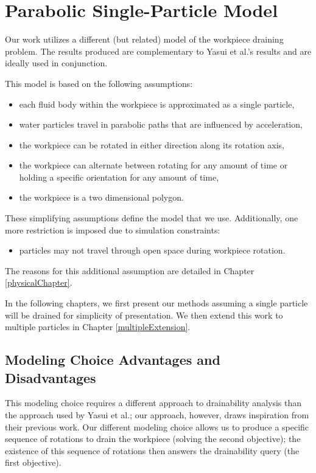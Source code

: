 \section{Parabolic Single-Particle Model}

Our work utilizes a different (but related) model of the workpiece draining problem. The results produced are complementary to Yasui et al.'s results and are ideally used in conjunction.

This model is based on the following assumptions:

\begin{itemize}
	\item each fluid body within the workpiece is approximated as a single particle,
	\item water particles travel in parabolic paths that are influenced by acceleration,
	\item the workpiece can be rotated in either direction along its rotation axis,
	\item the workpiece can alternate between rotating for any amount of time or holding a specific orientation for any amount of time,
	\item the workpiece is a two dimensional polygon.
\end{itemize}

These simplifying assumptions define the model that we use. Additionally, one more restriction is imposed due to simulation constraints:

\begin{itemize}
	\item particles may not travel through open space during workpiece rotation.
\end{itemize}

The reasons for this additional assumption are detailed in Chapter \ref{physicalChapter}.

In the following chapters, we first present our methods assuming a single particle will be drained for simplicity of presentation. We then extend this work to multiple particles in Chapter \ref{multipleExtension}.

	\subsection{Modeling Choice Advantages and Disadvantages}

This modeling choice requires a different approach to drainability analysis than the approach used by Yasui et al.; our approach, however, draws inspiration from their previous work. Our different modeling choice allows us to produce a specific sequence of rotations to drain the workpiece (solving the second objective); the existence of this sequence of rotations then answers the drainability query (the first objective).

